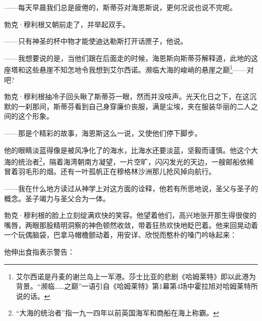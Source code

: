 \par ——每天早晨我们总是疲倦的，斯蒂芬对海恩斯说，更何况说也说不完呢。
\par 勃克·穆利根又朝前走了，并举起双手。
\par ——只有神圣的杯中物才能使迪达勒斯打开话匣子，他说。
\par ——我想要说的是，当他们跟在后面走的时候，海恩斯向斯蒂芬解释道，此地的这座塔和这些悬崖不知怎地令我想到艾尔西诺。濒临大海的峻峭的悬崖之巅\footnote{艾尔西诺是丹麦的谢兰岛上一军港。莎士比亚的悲剧《哈姆莱特》即以此港为背景。“濒临……之巅”一语引自《哈姆莱特》第1幕第4场中霍拉旭对哈姆莱特所说的话。}——对吧?
\par 勃克·穆利根抽冷子回头瞅了斯蒂芬一眼，然而并没吱声。光天化日之下，在这沉默的一刹那间，斯蒂芬看到自己身穿廉价丧服，满是尘埃，夹在服装华丽的二人之间的这个形象。
\par ——那是个精彩的故事，海恩斯这么一说，又使他们停下脚步。
\par 他的眼睛淡蓝得像是被风净化了的海水，比海水还要淡蓝，坚毅而谨慎。他这个大海的统治者\footnote{“大海的统治者”指一九一四年以前英国海军和商船在海上称霸。}，隔着海湾朝南方凝望，一片空旷，闪闪发光的天边，一艘邮船依稀冒着羽毛形的烟。还有一叶孤帆正在穆格林沙洲那儿抢风掉向航行。
\par ——我在什么地方读过从神学上对这方面的诠释，他若有所思地说，圣父与圣子的概念。圣子竭力与圣父合为一体。
\par 勃克·穆利根的脸上立刻绽满欢快的笑容。他望着他们，高兴地张开那生得很俊的嘴唇，两眼那股精明洞察的神色顿然收敛，带着狂热欢快地眨巴着。他来回晃动着一个玩偶脑袋，巴拿马帽檐颤动着，用安详、欣悦而憨朴的嗓门吟咏起来：
\par 他伸出食指表示警告：
